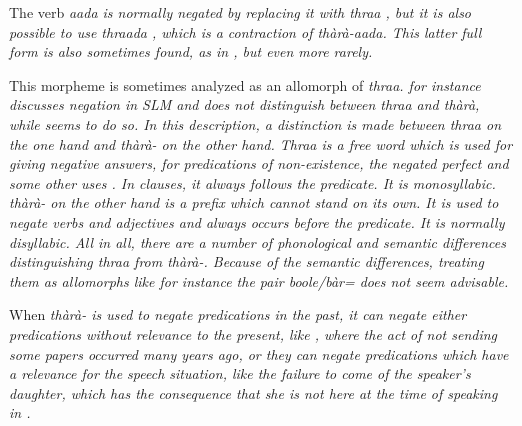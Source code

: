 The verb \em aada \em is normally negated by replacing it with \em thraa \em {}, but it is also possible to use \em thraada \em {}, which is a contraction of \em thàrà-aada\em. This latter full form is also sometimes found, as in , but even more rarely.



This morpheme is sometimes analyzed as an allomorph of \em thraa\em. 
\citet{Slomanson2006cll} for instance discusses negation in SLM and does not distinguish between \em thraa \em and \em thàrà\em, while \citet{Adelaar1991} seems to do so. In this description, a distinction is made between \em thraa \em on the one hand and \em thàrà- \em on the other hand. \em Thraa \em is a free word which is used for giving negative answers, for predications of non-existence, the negated perfect and some other uses . In clauses, it always follows the predicate. It is monosyllabic. \em thàrà- \em on the other hand is a prefix which cannot stand on its own. It is used to negate verbs and adjectives and always occurs before the predicate. It is normally disyllabic. All in all, there are a number of phonological and semantic differences distinguishing \em thraa \em from \em thàrà-\em. Because of the semantic differences, treating them as allomorphs like for instance the pair \em boole/bàr= \em does not seem advisable.

When \em thàrà- \em is used to negate predications in the past, it can negate either predications without relevance to the present, like , where the act of not sending some papers occurred many years ago, or they can negate predications which have a relevance for the speech situation, like the failure to come of the speaker's daughter, which has the consequence that she is not here at the time of speaking in .


